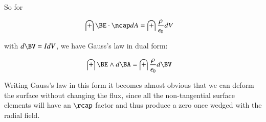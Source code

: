 \documentclass{article}
\begin{document}
So for

\begin{align*}
\int \BE \cdot \ncap dA
&= \int \frac{\rho}{\epsilon_0} dV
\end{align*}

with $d\BV = I dV$, we have Gauss's law in dual form:

\begin{align*}
\int \BE \wedge d\BA &= \int \frac{\rho}{\epsilon_0} d\BV
\end{align*}

Writing Gauss's law in this form it becomes almost obvious that we can 
deform the surface without changing the flux, since all the non-tangential
surface elements will have an $\rcap$ factor and thus produce a zero
once wedged with the radial field.



\end{document}

